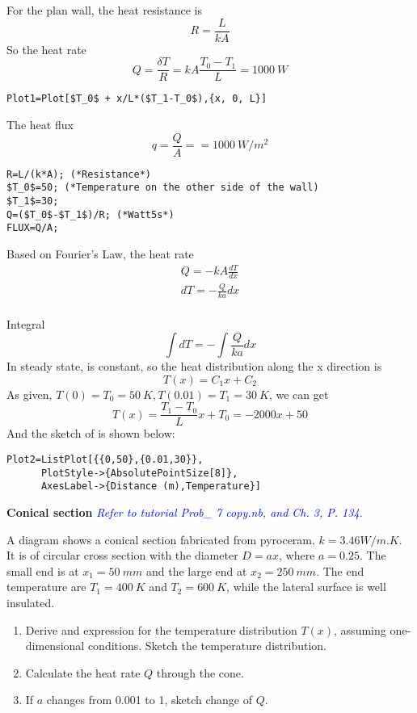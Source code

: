 \begin{solution}
For the plan wall, the heat resistance is
$$R=\frac{L}{kA}$$
So the heat rate 
$$
Q=\frac{\delta T}{R}=kA\frac{T_0-T_1}{L}=1000~W
$$

\begin{lstlisting}
Plot1=Plot[$T_0$ + x/L*($T_1-T_0$),{x, 0, L}]
\end{lstlisting}
The heat flux$$q=\frac{Q}{A}==1000~W/m^2$$
\begin{lstlisting}
R=L/(k*A); (*Resistance*)
$T_0$=50; (*Temperature on the other side of the wall)
$T_1$=30;
Q=($T_0$-$T_1$)/R; (*Watt5s*)
FLUX=Q/A;
\end{lstlisting}
Based on Fourier’s Law, the heat rate
\begin{eqnarray*}
Q=-kA\frac{dT}{dx}\\
dT=-\frac{Q}{ka}dx
\end{eqnarray*}
~\\
Integral
$$\int dT=-\int \frac{Q}{ka} dx$$
In steady state,  is constant, so the heat distribution along the x direction is
$$T(x)=C_1x+C_2$$
As given, $T(0)=T_0=50~K, T(0.01)=T_1=30~K$, we can get
$$T(x)=\frac{T_1-T_0}{L}x+T_0=-2000x+50$$
And the sketch of  is shown below:
\begin{lstlisting}
Plot2=ListPlot[{{0,50},{0.01,30}},
      PlotStyle->{AbsolutePointSize[8]},
      AxesLabel->{Distance (m),Temperature}]
\end{lstlisting}
\end{solution}

\begin{example}
\textbf{Conical section} \textcolor{blue} {\emph{Refer to tutorial 
Prob\_ 7 copy.nb, and Ch. 3, P. 134.}}

A diagram shows a conical section fabricated from pyroceram, $k=3.46W/m.K$.
It is of circular cross section with the diameter $D=ax$, where $a=0.25$.
The small end is at $x_1=50~mm$ and the large end at $x_2=250~mm$.
The end temperature are $T_1=400~K$ and $T_2=600~K$, while the lateral 
surface is well insulated.
\begin{enumerate}
\item Derive and expression for the temperature distribution $T(x)$,
assuming one-dimensional conditions. Sketch the temperature distribution.
\item Calculate the heat rate $Q$ through the cone.
\item If $a$ changes from 0.001 to 1, sketch change of $Q$.
\end{enumerate}
\end{example}

